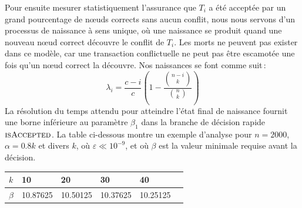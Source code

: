 \documentclass[a4,twocolumn,10pt]{article}
\theoremstyle{definition}
\begin{document}
\begin{appendices}
Pour ensuite mesurer statistiquement l'assurance que $T_i$ a été acceptée par un grand pourcentage de nœuds corrects sans aucun conflit, nous nous servons d'un processus de naissance à sens unique, où une naissance se produit quand une nouveau nœud correct découvre le conflit de $T_i$. Les morts ne peuvent pas exister dans ce modèle, car une transaction conflictuelle ne peut pas être escamotée une fois qu'un nœud correct la découvre.
Nos naissances se font comme suit\,:
\begin{equation}
    \lambda_i = \frac{c - i}{c} \left(1 - \frac{{n - i \choose k}}{{n \choose k}}\right)
\end{equation}
La résolution du temps attendu pour atteindre l'état final de naissance fournit une borne inférieure au paramètre $\beta_1$ dans la branche de décision rapide $\textsc{isAccepted}$. La table ci-dessous montre un exemple d'analyse pour $n = 2000$, $\alpha = 0.8k$ et divers $k$, où $\varepsilon \ll 10^{-9}$, et où $\beta$ est la valeur minimale requise avant la décision.
\begin{table}[h!]
    \small
	\centering
	\begin{tabular}{llllll}
		$k$   & 10 & 20 & 30 & 40 \\ \hline
		$\beta$ & 10.87625 & 10.50125 & 10.37625 & 10.25125
	\end{tabular}
	\label{table:fast-path-beta}
\end{table}


\end{appendices}
\end{document}

